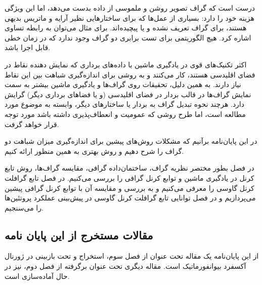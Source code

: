 درست است که گراف تصویر روشن و ملموسی از داده بدست می‌دهد، اما این ویژگی هزینه خود را دارد: بسیاری از عمل‌ها که برای ساختارهایی نظیر آرایه و ماتریس بدیهی هستند، برای گراف تعریف نشده و یا پیچیده‌اند. برای مثال می‌توان به رابطه تساوی اشاره کرد. هیچ الگوریتمی برای تست برابری دو گراف وجود ندارد که در زمان خطی قابل اجرا باشد.

اکثر تکنیک‌های قوی در یادگیری ماشین با داده‌های برداری که نمایش دهنده نقاط در فضای اقلیدسی هستند، کار می‌کنند و به روشی برای اندازه‌گیری شباهت بین این نقاط نیاز دارند. به همین دلیل، تحقیقات روی گراف‌ها و یادگیری ماشین بیشتر به سمت نمایش گراف‌ها در قالب بردار در فضای اقلیدسی (و یا فضاهای برداری دیگر) گرایش دارد. هرچند نحوه تبدیل گراف به بردار یا ساختارهای دیگر، وابسته به موضوع مورد مطالعه است، اما طرح روشی که عمومیت و انعطاف‌پذیری داشته باشد مورد توجه قرار خواهد گرفت.

در این پایان‌نامه برآنیم که مشکلات روش‌های پیشین برای اندازه‌گیری میزان شباهت دو گراف را شرح دهیم و روش بهتری به همین منظور ارائه کنیم.

در فصل  بطور مختصر نظریه گراف، ساختمان‌داده‌ گرافی، مقایسه گراف‌ها، روش تابع کرنل در یادگیری ماشین و توابع کرنل گرافی را بررسی می‌کنیم. در فصل  تابع گرافلت کرنل گاوسی را معرفی می‌کنیم و به بررسی و مقایسه آن با توابع کرنل گرافی پیشین می‌پردازیم و در فصل  توانایی تابع گرافلت کرنل گاوسی در پیش‌بینی عملکرد پروتئین‌ها را می‌سنجیم.

\subsection*{
مقالات مستخرج از این پایان نامه
}
از این پایان‌نامه یک مقاله تحت عنوان 
از فصل سوم، استخراج و تحت بازبینی در ژورنال آکسفرد بیوانفورماتیک است. 
مقاله دیگری تحت عنوان 
برگرفته از فصل دوم، نیز در حال آماده‌سازی است.